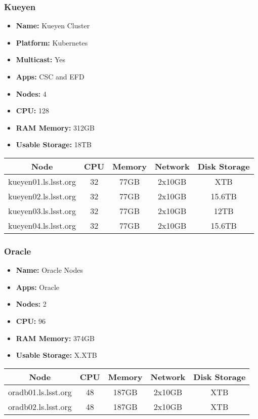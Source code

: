 \newpage
\subsubsection{Kueyen}
\begin{itemize}
  \itemsep0em 
  \item \textbf{Name:}       Kueyen Cluster
  \item \textbf{Platform:}   Kubernetes
  \item \textbf{Multicast:}  Yes
  \item \textbf{Apps:}       CSC and EFD
  \item \textbf{Nodes:}      4
  \item \textbf{CPU:}        128
  \item \textbf{RAM Memory:} 312GB
  \item \textbf{Usable Storage:}   18TB
\end{itemize}
\begin{center}
  \small
  \begin{tabular}{||c c c c c||}
    \hline
    \textbf{Node} & \textbf{CPU} & \textbf{Memory} & \textbf{Network} & \textbf{Disk Storage} \\ [0.5ex]
    \hline
    kueyen01.ls.lsst.org & 32 & 77GB & 2x10GB & XTB \\
    \hline
    kueyen02.ls.lsst.org & 32 & 77GB & 2x10GB & 15.6TB \\
    \hline
    kueyen03.ls.lsst.org & 32 & 77GB & 2x10GB & 12TB \\
    \hline
    kueyen04.ls.lsst.org & 32 & 77GB & 2x10GB & 15.6TB \\
    \hline
  \end{tabular}
\end{center}

\subsubsection{Oracle}
\begin{itemize}
  \itemsep0em 
  \item \textbf{Name:}       Oracle Nodes
  \item \textbf{Apps:}       Oracle
  \item \textbf{Nodes:}      2
  \item \textbf{CPU:}        96
  \item \textbf{RAM Memory:} 374GB
  \item \textbf{Usable Storage:}   X.XTB
\end{itemize}
\begin{center}
  \small
  \begin{tabular}{||c c c c c||} 
    \hline
    \textbf{Node} & \textbf{CPU} & \textbf{Memory} & \textbf{Network} & \textbf{Disk Storage} \\ [0.5ex] 
    \hline
    oradb01.ls.lsst.org & 48 & 187GB & 2x10GB & XTB \\
    \hline
    oradb02.ls.lsst.org & 48 & 187GB & 2x10GB & XTB \\
    \hline
  \end{tabular}
\end{center}

